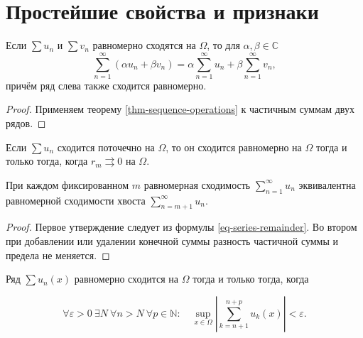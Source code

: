 \section{Простейшие свойства и признаки}\label{sec-series-02}

\begin{theorem}[Линейность]\label{thm-series-linear}

Если \(\sum u_n\) и \(\sum v_n\) равномерно сходятся на \(\Omega\), то для \(\alpha,\beta\in\mathbb C\) \[
\sum_{n=1}^\infty(\alpha u_n+\beta v_n)
=\alpha\sum_{n=1}^\infty u_n+\beta\sum_{n=1}^\infty v_n,
\] причём ряд слева также сходится равномерно.

\end{theorem}

\begin{proof}

Применяем теорему \ref{thm-sequence-operations} к частичным суммам двух рядов.

\end{proof}

\begin{theorem}\label{thm-series-tail}

Если \(\sum u_n\) сходится поточечно на \(\Omega\), то он сходится равномерно на \(\Omega\) тогда и только тогда, когда \(r_m\rightrightarrows0\) на \(\Omega\).

При каждом фиксированном \(m\) равномерная сходимость \(\sum_{n=1}^\infty u_n\) эквивалентна равномерной сходимости хвоста \(\sum_{n=m+1}^\infty u_n\).

\end{theorem}

\begin{proof}

Первое утверждение следует из формулы \eqref{eq-series-remainder}. Во втором при добавлении или удалении конечной суммы разность частичной суммы и предела не меняется.

\end{proof}

\begin{theorem}\label{thm-series-cauchy}

Ряд \(\sum u_n(x)\) равномерно сходится на \(\Omega\) тогда и только тогда, когда

\begin{equation}
\forall\varepsilon>0\ \exists N\ \forall n>N\ \forall p\in\mathbb N:
\quad\sup_{x\in\Omega}\left|\sum_{k=n+1}^{n+p}u_k(x)\right|<\varepsilon.
\label{eq-series-cauchy}
\end{equation}

\end{theorem}

